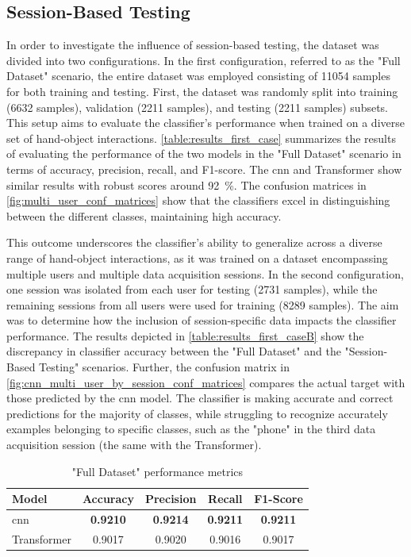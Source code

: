 \subsection{Session-Based Testing}
In order to investigate the influence of session-based testing, the dataset was divided into two configurations. In the first configuration, referred to as the "Full Dataset" scenario, the entire dataset was employed consisting of \num{11054} samples for both training and testing. First, the dataset was randomly split into training (\num{6632} samples), validation (\num{2211} samples), and testing (\num{2211} samples) subsets. This setup aims to evaluate the classifier's performance when trained on a diverse set of hand-object interactions. \autoref{table:results_first_case} summarizes the results of evaluating the performance of the two models in the "Full Dataset" scenario in terms of accuracy, precision, recall, and F1-score. The \acs{cnn} and Transformer show similar results with robust scores around \SI{92}{\percent}. The confusion matrices in \autoref{fig:multi_user_conf_matrices} show that the classifiers excel in distinguishing between the different classes, maintaining high accuracy. 

This outcome underscores the classifier's ability to generalize across a diverse range of hand-object interactions, as it was trained on a dataset encompassing multiple users and multiple data acquisition sessions. In the second configuration, one session was isolated from each user for testing (\num{2731} samples), while the remaining sessions from all users were used for training (\num{8289} samples). The aim was to determine how the inclusion of session-specific data impacts the classifier performance. The results depicted in \autoref{table:results_first_caseB} show the discrepancy in classifier accuracy between the "Full Dataset" and the "Session-Based Testing" scenarios. Further, the confusion matrix in \autoref{fig:cnn_multi_user_by_session_conf_matrices} compares the actual target with those predicted by the \acs{cnn} model. The classifier is making accurate and correct predictions for the majority of classes, while struggling to recognize accurately examples belonging to specific classes, such as the "phone" in the third data acquisition session (the same with the Transformer).

\begin{table}[ht]
    \centering
    \caption{"Full Dataset" performance metrics}
    \label{table:results_first_case}
    \begin{tabular}{lcccc}
        \toprule
        Model & Accuracy & Precision & Recall & F1-Score \\
        \midrule
        \acs{cnn} & \textbf{0.9210} & \textbf{0.9214} & \textbf{0.9211} & \textbf{0.9211} \\
        Transformer & 0.9017 & 0.9020 & 0.9016 & 0.9017 \\
        \bottomrule
    \end{tabular}
\end{table}


